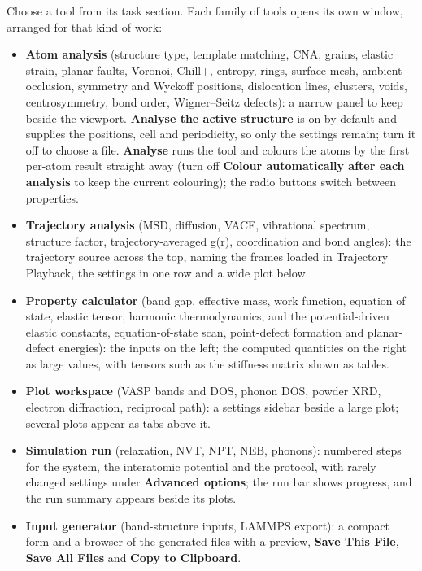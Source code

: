 Choose a tool from its task section. Each family of tools opens its own window, arranged for that kind of work:
\begin{itemize}
\item \textbf{Atom analysis} (structure type, template matching, CNA, grains, elastic strain, planar faults, Voronoi, Chill+, entropy, rings, surface mesh, ambient occlusion, symmetry and Wyckoff positions, dislocation lines, clusters, voids, centrosymmetry, bond order, Wigner--Seitz defects): a narrow panel to keep beside the viewport. \textbf{Analyse the active structure} is on by default and supplies the positions, cell and periodicity, so only the settings remain; turn it off to choose a file. \textbf{Analyse} runs the tool and colours the atoms by the first per-atom result straight away (turn off \textbf{Colour automatically after each analysis} to keep the current colouring); the radio buttons switch between properties.
\item \textbf{Trajectory analysis} (MSD, diffusion, VACF, vibrational spectrum, structure factor, trajectory-averaged g(r), coordination and bond angles): the trajectory source across the top, naming the frames loaded in Trajectory Playback, the settings in one row and a wide plot below.
\item \textbf{Property calculator} (band gap, effective mass, work function, equation of state, elastic tensor, harmonic thermodynamics, and the potential-driven elastic constants, equation-of-state scan, point-defect formation and planar-defect energies): the inputs on the left; the computed quantities on the right as large values, with tensors such as the stiffness matrix shown as tables.
\item \textbf{Plot workspace} (VASP bands and DOS, phonon DOS, powder XRD, electron diffraction, reciprocal path): a settings sidebar beside a large plot; several plots appear as tabs above it.
\item \textbf{Simulation run} (relaxation, NVT, NPT, NEB, phonons): numbered steps for the system, the interatomic potential and the protocol, with rarely changed settings under \textbf{Advanced options}; the run bar shows progress, and the run summary appears beside its plots.
\item \textbf{Input generator} (band-structure inputs, LAMMPS export): a compact form and a browser of the generated files with a preview, \textbf{Save This File}, \textbf{Save All Files} and \textbf{Copy to Clipboard}.
\end{itemize}
